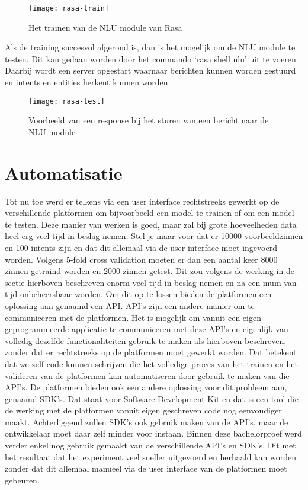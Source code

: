 \begin{figure}[H]
    \label{fig:rasa-train}
    \centering
    \texttt{[image: rasa-train]}
    \caption{Het trainen van de NLU module van Rasa}
\end{figure}

Als de training succesvol afgerond is, dan is het mogelijk om de NLU module te testen. Dit kan gedaan worden door het commando ‘rasa shell nlu’ uit te voeren. Daarbij wordt een server opgestart waarnaar berichten kunnen worden gestuurd en intents en entities herkent kunnen worden. 

\begin{figure}[H]
    \label{fig:rasa-test}
    \centering
    \texttt{[image: rasa-test]}
    \caption{Voorbeeld van een response bij het sturen van een bericht naar de NLU-module}
\end{figure}

\section{Automatisatie}
\label{sec:automatisatie}

Tot nu toe werd er telkens via een user interface rechtstreeks gewerkt op de verschillende platformen om bijvoorbeeld een model te trainen of om een model te testen. Deze manier van werken is goed, maar zal bij grote hoeveelheden data heel erg veel tijd in beslag nemen. Stel je maar voor dat er 10000 voorbeeldzinnen  en 100 intents zijn en dat dit allemaal via de user interface moet ingevoerd worden. Volgens 5-fold cross validation moeten er dan een aantal keer 8000 zinnen getraind worden en 2000 zinnen getest. Dit zou volgens de werking in de sectie hierboven beschreven enorm veel tijd in beslag nemen en na een mum van tijd onbeheersbaar worden. Om dit op te lossen bieden de platformen een oplossing aan genaamd een API. API’s zijn een andere manier om te communiceren met de platformen. Het is mogelijk om vanuit een eigen geprogrammeerde applicatie te communiceren met deze API’s en eigenlijk van volledig dezelfde functionaliteiten gebruik te maken als hierboven beschreven, zonder dat er rechtstreeks op de platformen moet gewerkt worden. Dat betekent dat we zelf code kunnen schrijven die het volledige proces van het trainen en het valideren van de platformen kan automatiseren door gebruik te maken van die API’s. De platformen bieden ook een andere oplossing voor dit probleem aan, genaamd SDK's. Dat staat voor Software Development Kit en dat is een tool die de werking met de platformen vanuit eigen geschreven code nog eenvoudiger maakt. Achterliggend zullen SDK's ook gebruik maken van de API's, maar de ontwikkelaar moet daar zelf minder voor instaan. Binnen deze bachelorproef werd verder enkel nog gebruik gemaakt van de verschillende API’s en SDK's. Dit met het resultaat dat het experiment veel sneller uitgevoerd en herhaald kan worden zonder dat dit allemaal manueel via de user interface van de platformen moet gebeuren.

